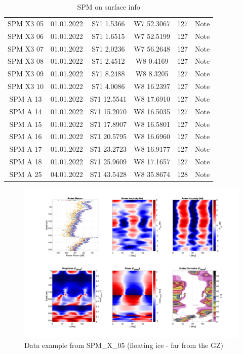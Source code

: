 \documentclass[a4paper,12pt]{article}
\begin{document}
\begin{table}[H]
\begin{tabular}[width=\textwidth]{c c c c c c}
    SPM X3 05 & 01.01.2022 & S71 1.5366 & W7 52.3067 & 127 & Note \\
    SPM X3 06 & 01.01.2022 & S71 1.6515 & W7 52.5199 & 127 & Note \\
    SPM X3 07 & 01.01.2022 & S71 2.0236 & W7 56.2648 & 127 & Note \\
    SPM X3 08 & 01.01.2022 & S71 2.4512 & W8 0.4169 & 127 & Note \\
    SPM X3 09 & 01.01.2022 & S71 8.2488 & W8 8.3205 & 127 & Note \\
    SPM X3 10 & 01.01.2022 & S71 4.0086 & W8 16.2397 & 127 & Note \\
    SPM A 13 & 01.01.2022 & S71 12.5541 & W8 17.6910 & 127 & Note \\
    SPM A 14 & 01.01.2022 & S71 15.2070 & W8 16.5035 & 127 & Note \\
    SPM A 15 & 01.01.2022 & S71 17.8907 & W8 16.5801 & 127 & Note \\
    SPM A 16 & 01.01.2022 & S71 20.5795 & W8 16.6960 & 127 & Note \\
    SPM A 17 & 01.01.2022 & S71 23.2723 & W8 16.9177 & 127 & Note \\
    SPM A 18 & 01.01.2022 & S71 25.9609 & W8 17.1657 & 127 & Note \\
    SPM A 25 & 04.01.2022 & S71 43.5428 & W8 35.8674 & 128 & Note \\
    \hline
  \end{tabular}
  \caption{SPM on surface info}
  \label{Table_SPM_surface}
\end{table}

\begin{figure}[H]
	\includegraphics[width=\linewidth]{Figures/SPM_X_05.png}
	\caption{Data example from SPM\_X\_05 (floating ice - far from the GZ)}
	\label{fig_SPM_X_05}
\end{figure}
\end{document}

